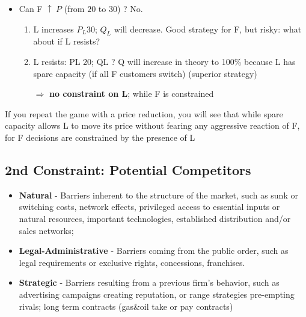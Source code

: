 \begin{enumerate}
{\begin{itemize}
\begin{enumerate}
                        \end{enumerate}
                    \item Can F \(\uparrow \ P\) (from $20$ to $30$) ? No.
                        \begin{enumerate}
                            \item L increases $P_L 30$; $Q_L$ will decrease. Good strategy for F, but risky: what about if L resists?
                            \item L resists: PL 20; QL ? Q will increase in theory to 100\% because L has spare capacity (if all F customers switch) (superior strategy)
                            \item[\(\Rightarrow\)] \textbf{no constraint on L}; while F is constrained
                        \end{enumerate}
                \end{itemize}
                If you repeat the game with a price reduction, you will see that while spare capacity allows L to move its price without fearing any aggressive reaction of F, for F decisions are constrained by the presence of L
                }
                
    \end{enumerate}

    \subsection{2nd Constraint: Potential Competitors}


        \begin{itemize}
            \item \textbf{Natural} - Barriers inherent to the structure of the market, such as sunk or switching costs, network effects, privileged access to essential inputs or natural resources, important technologies, established distribution and/or sales networks; 
            \item \textbf{Legal-Administrative} - Barriers coming from the public order, such as legal requirements or exclusive rights, concessions, franchises. 
            \item \textbf{Strategic} - Barriers resulting from a previous firm’s behavior, such as advertising campaigns creating reputation, or range strategies pre-empting rivals; long term contracts (gas\&oil take or pay contracts)
        \end{itemize}

